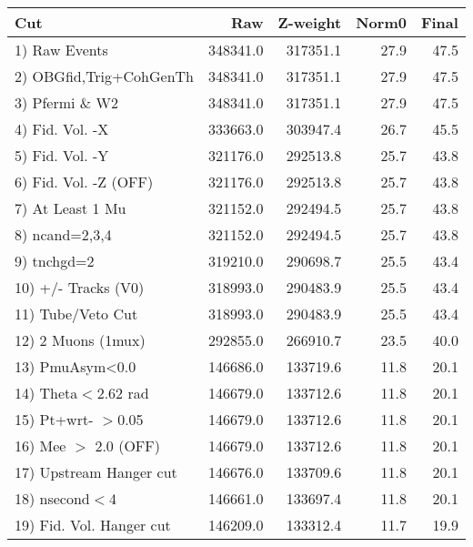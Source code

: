  \begin{table}[h!]\centering
 \begin{tabular}{||l||r|r|r|r||}
 \hline
 \hline
 Cut & Raw & Z-weight & Norm0 & Final \\
 \hline
  1) Raw Events           &    348341.0 &    317351.1 &        27.9 &        47.5 \\
  2) OBGfid,Trig+CohGenTh &    348341.0 &    317351.1 &        27.9 &        47.5 \\
  3) Pfermi \& W2         &    348341.0 &    317351.1 &        27.9 &        47.5 \\
  4) Fid. Vol. -X         &    333663.0 &    303947.4 &        26.7 &        45.5 \\
  5) Fid. Vol. -Y         &    321176.0 &    292513.8 &        25.7 &        43.8 \\
  6) Fid. Vol. -Z (OFF)   &    321176.0 &    292513.8 &        25.7 &        43.8 \\
  7) At Least 1 Mu        &    321152.0 &    292494.5 &        25.7 &        43.8 \\
  8) ncand=2,3,4          &    321152.0 &    292494.5 &        25.7 &        43.8 \\
  9) tnchgd=2             &    319210.0 &    290698.7 &        25.5 &        43.4 \\
 10) +/- Tracks (V0)      &    318993.0 &    290483.9 &        25.5 &        43.4 \\
 11) Tube/Veto Cut        &    318993.0 &    290483.9 &        25.5 &        43.4 \\
 12) 2 Muons (1mux)       &    292855.0 &    266910.7 &        23.5 &        40.0 \\
 13) PmuAsym<0.0          &    146686.0 &    133719.6 &        11.8 &        20.1 \\
 14) Theta$<$2.62 rad     &    146679.0 &    133712.6 &        11.8 &        20.1 \\
 15) Pt+wrt- $>$0.05      &    146679.0 &    133712.6 &        11.8 &        20.1 \\
 16) Mee $>$ 2.0  (OFF)   &    146679.0 &    133712.6 &        11.8 &        20.1 \\
 17) Upstream Hanger cut  &    146676.0 &    133709.6 &        11.8 &        20.1 \\
 18) nsecond$<$4          &    146661.0 &    133697.4 &        11.8 &        20.1 \\
 19) Fid. Vol. Hanger cut &    146209.0 &    133312.4 &        11.7 &        19.9 \\

\end{tabular}
\end{table}
